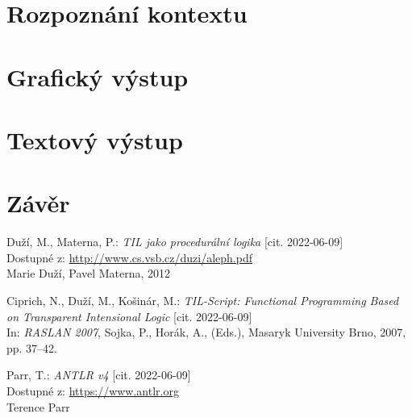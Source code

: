 \documentclass{article}
\begin{document}
\section{Rozpoznání kontextu}

\section{Grafický výstup}

\section{Textový výstup}

\section{Závěr}



\begin{thebibliography}{50}

Duží, M., Materna, P.: \textit{TIL jako procedurální logika} [cit. 2022-06-09] \\
Dostupné z: \url{http://www.cs.vsb.cz/duzi/aleph.pdf} \\
Marie Duží, Pavel Materna, 2012

Ciprich, N., Duží, M., Košinár, M.: \textit{TIL-Script: Functional Programming Based on
Transparent Intensional Logic} [cit. 2022-06-09] \\
In: \textit{RASLAN 2007}, Sojka, P., Horák, A., (Eds.), Masaryk University Brno, 2007, pp. 37–42.

Parr, T.: \textit{ANTLR v4} [cit. 2022-06-09] \\
Dostupné z: \url{https://www.antlr.org} \\
Terence Parr

\end{thebibliography}
\end{document}
